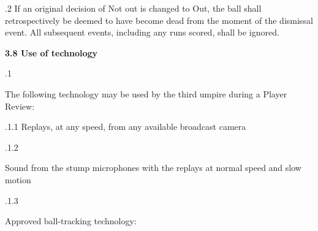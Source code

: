 \documentclass[12pt]{article}
\begin{document}
\vspace{\baselineskip}
\begin{adjustwidth}{0.5in}{0.04in}
{\fontsize{9pt}{10.8pt}.2 \tabto{0.49in} If an original decision of Not out is changed to Out, the ball shall retrospectively be deemed to have become dead from the moment of the dismissal event. All subsequent events, including any runs scored, shall be ignored.\par}\par

\end{adjustwidth}


\vspace{\baselineskip}
{\fontsize{11pt}{13.2pt}\selectfont \textbf{3.8 \tabto{0.47in} Use of technology}\par}\par


\vspace{\baselineskip}
{\fontsize{9pt}{10.8pt}.1 \tabto{0.49in} {\fontsize{8pt}{9.6pt}\selectfont The following technology may be used by the third umpire during a Player Review:\par}\par}\par


\vspace{\baselineskip}
\begin{adjustwidth}{0.49in}{0.0in}
{\fontsize{9pt}{10.8pt}.1.1 \tabto{1.17in} Replays, at any speed, from any available broadcast camera\par}\par

\end{adjustwidth}


\vspace{\baselineskip}
\begin{adjustwidth}{0.49in}{0.0in}
{\fontsize{9pt}{10.8pt}.1.2 \tabto{1.17in} {\fontsize{8pt}{9.6pt}\selectfont Sound from the stump microphones with the replays at normal speed and slow motion\par}\par}\par

\end{adjustwidth}


\vspace{\baselineskip}
\begin{adjustwidth}{0.49in}{0.0in}
{\fontsize{9pt}{10.8pt}.1.3 \tabto{1.17in} {\fontsize{8pt}{9.6pt}\selectfont Approved ball-tracking technology:\par}\par}\par

\end{adjustwidth}
\end{document}
